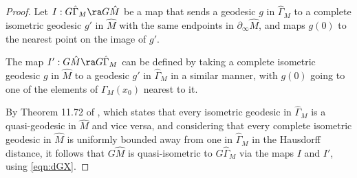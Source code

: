 \begin{proof}
Let $I: G\hat{\Gamma}_M \ra G\hat{M}$ be a map that sends a geodesic $g$ in $\hat{\Gamma}_M$ to a complete isometric geodesic $g'$ in $\hat{M}$ with the same endpoints in $\partial_\infty \hat{M}$, and maps $g(0)$ to the nearest point on the image of $g'$.

The map $I': G\hat{M} \ra G\hat{\Gamma}_M$ can be defined by taking a complete isometric geodesic $g$ in $\hat{M}$ to a geodesic $g'$ in $\hat{\Gamma}_M$ in a similar manner, with $g(0)$ going to one of the elements of $\Gamma_M(x_0)$ nearest to it.

By Theorem 11.72 of \cite{DK2018}, which states that every isometric geodesic in $\hat{\Gamma}_M$ is a quasi-geodesic in $\hat{M}$ and vice versa, and considering that every complete isometric geodesic in $\hat{M}$ is uniformly bounded away from one in $\hat{\Gamma}_M$ in the Hausdorff distance, it follows that $G\hat{M}$ is quasi-isometric to $G\hat{\Gamma}_M$ via the maps $I$ and $I'$, using \eqref{eqn:dGX}.

	

\end{proof}
